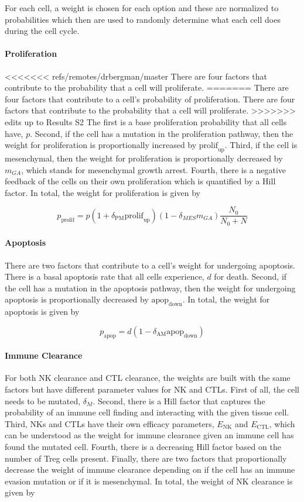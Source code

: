 \documentclass{article}
\begin{document}
For each cell, a weight is chosen for each option and these are normalized to probabilities which then are used to randomly determine what each cell does during the cell cycle.

\paragraph{Proliferation}
<<<<<<< refs/remotes/drbergman/master
There are four factors that contribute to the probability that a cell will proliferate.
=======
There are four factors that contribute to a cell's probability of proliferation.
There are four factors that contribute to the probability that a cell will proliferate.
% 
>>>>>>> edits up to Results S2
The first is a base proliferation probability that all cells have, $p$.
Second, if the cell has a mutation in the proliferation pathway, then the weight for proliferation is proportionally increased by $\text{prolif}_{\text{up}}$.
Third, if the cell is mesenchymal, then the weight for proliferation is proportionally decreased by $m_{GA}$, which stands for mesenchymal growth arrest.
Fourth, there is a negative feedback of the cells on their own proliferation which is quantified by a Hill factor.
In total, the weight for proliferation is given by

$$ p_{\text{prolif}} = p(1+\delta_{\text{PM}}\text{prolif}_{\text{up}})(1-\delta_{MES}m_{GA})\frac{N_0}{N_0+N} $$

\paragraph{Apoptosis}
There are two factors that contribute to a cell's weight for undergoing apoptosis.
There is a basal apoptosis rate that all cells experience, $d$ for death.
Second, if the cell has a mutation in the apoptosis pathway, then the weight for undergoing apoptosis is proportionally decreased by $\text{apop}_{\text{down}}$.
In total, the weight for apoptosis is given by 

$$ p_{\text{apop}} = d(1-\delta_{\text{AM}}\text{apop}_{\text{down}}) $$

\paragraph{Immune Clearance}
For both NK clearance and CTL clearance, the weights are built with the same factors but have different parameter values for NK and CTLs.
First of all, the cell needs to be mutated, $\delta_M$.
Second, there is a Hill factor that captures the probability of an immune cell finding and interacting with the given tissue cell.
Third, NKs and CTLs have their own efficacy parameters, $E_{\text{NK}}$ and $E_{\text{CTL}}$, which can be understood as the weight for immune clearance given an immune cell has found the mutated cell.
Fourth, there is a decreasing Hill factor based on the number of Treg cells present.
Finally, there are two factors that proportionally decrease the weight of immune clearance depending on if the cell has an immune evasion mutation or if it is mesenchymal.
In total, the weight of NK clearance is given by
\end{document}
